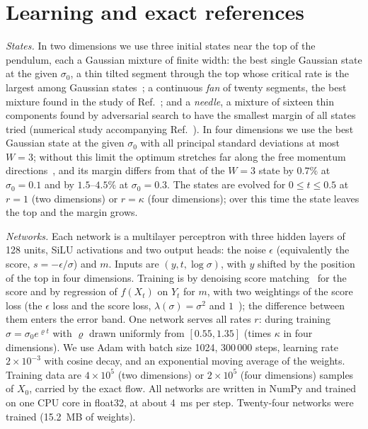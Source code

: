 \section{Learning and exact references}
\label{sec:learning}

\emph{States.} In two dimensions we use three initial states near the top of the pendulum, each a Gaussian mixture of finite width: the best single Gaussian state at the given $\sigma_0$, a thin tilted segment through the top whose critical rate is the largest among Gaussian states~\cite{namba2026gap}; a continuous \emph{fan} of twenty segments, the best mixture found in the study of Ref.~\cite{namba2026gap}; and a \emph{needle}, a mixture of sixteen thin components found by adversarial search to have the smallest margin of all states tried (numerical study accompanying Ref.~\cite{namba2026many}). In four dimensions we use the best Gaussian state at the given $\sigma_0$ with all principal standard deviations at most $W = 3$; without this limit the optimum stretches far along the free momentum directions~\cite{namba2026many}, and its margin differs from that of the $W = 3$ state by $0.7\%$ at $\sigma_0 = 0.1$ and by $1.5$--$4.5\%$ at $\sigma_0 = 0.3$. The states are evolved for $0 \leq t \leq 0.5$ at $r = 1$ (two dimensions) or $r = \kappa$ (four dimensions); over this time the state leaves the top and the margin grows.

\emph{Networks.} Each network is a multilayer perceptron with three hidden layers of 128 units, SiLU activations and two output heads: the noise $\epsilon$ (equivalently the score, $s = -\epsilon/\sigma$) and $m$. Inputs are $(y, t, \log\sigma)$, with $y$ shifted by the position of the top in four dimensions. Training is by denoising score matching~\cite{vincent2011,hyvarinen2005} for the score and by regression of $f(X_t)$ on $Y_t$ for $m$, with two weightings of the score loss (the $\epsilon$ loss and the score loss, $\lambda(\sigma) = \sigma^2$ and $1$~\cite{ho2020,song2021}); the difference between them enters the error band. One network serves all rates $r$: during training $\sigma = \sigma_0 e^{\varrho t}$ with $\varrho$ drawn uniformly from $[0.55, 1.35]$ (times $\kappa$ in four dimensions). We use Adam with batch size 1024, 300\,000 steps, learning rate $2\times10^{-3}$ with cosine decay, and an exponential moving average of the weights. Training data are $4\times10^5$ (two dimensions) or $2\times10^5$ (four dimensions) samples of $X_0$, carried by the exact flow. All networks are written in NumPy and trained on one CPU core in float32, at about 4~ms per step. Twenty-four networks were trained (15.2~MB of weights).

